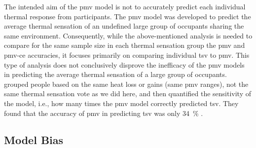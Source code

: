 The intended aim of the \ac{pmv} model is not to accurately predict each individual thermal response from participants.
The \ac{pmv} model was developed to predict the average thermal sensation of an undefined large group of occupants sharing the same environment.
Consequently, while the above-mentioned analysis is needed to compare for the same sample size in each thermal sensation group the \ac{pmv} and \ac{pmv-ce} accuracies, it focuses primarily on comparing individual \ac{tsv} to \ac{pmv}.
This type of analysis does not conclusively disprove the inefficacy of the \ac{pmv} models in predicting the average thermal sensation of a large group of occupants.
 grouped people based on the same heat loss or gains (same \ac{pmv} ranges), not the same thermal sensation vote as we did here, and then quantified the sensitivity of the model, i.e., how many times the \ac{pmv} model correctly predicted \ac{tsv}.
They found that the accuracy of \ac{pmv} in predicting \ac{tsv} was only \qty{34}{\percent} . 

\subsection{Model Bias}\label{subsec:model-bias}
